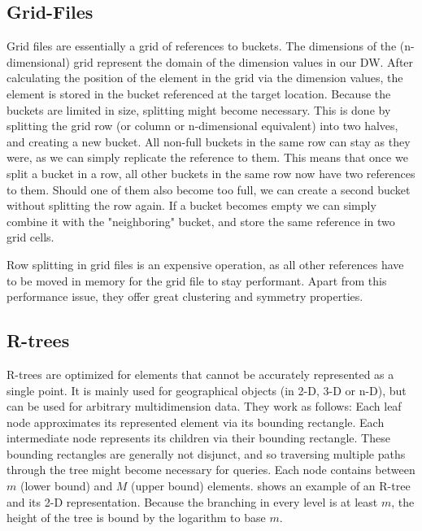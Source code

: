 \documentclass{article}
\begin{document}
\subsection{Grid-Files}
Grid files are essentially a grid of references to buckets.
The dimensions of the (n-dimensional) grid represent the domain of the dimension values in our DW.
After calculating the position of the element in the grid via the dimension values, the element is stored in the bucket referenced at the target location.
Because the buckets are limited in size, splitting might become necessary.
This is done by splitting the grid row (or column or n-dimensional equivalent) into two halves, and creating a new bucket.
All non-full buckets in the same row can stay as they were, as we can simply replicate the reference to them.
This means that once we split a bucket in a row, all other buckets in the same row now have two references to them.
Should one of them also become too full, we can create a second bucket without splitting the row again.
If a bucket becomes empty we can simply combine it with the "neighboring" bucket, and store the same reference in two grid cells.

Row splitting in grid files is an expensive operation, as all other references have to be moved in memory for the grid file to stay performant.
Apart from this performance issue, they offer great clustering and symmetry properties.

\subsection{R-trees}
R-trees are optimized for elements that cannot be accurately represented as a single point.
It is mainly used for geographical objects (in 2-D, 3-D or n-D), but can be used for arbitrary multidimension data.
They work as follows:
Each leaf node approximates its represented element via its bounding rectangle.
Each intermediate node represents its children via their bounding rectangle.
These bounding rectangles are generally not disjunct, and so traversing multiple paths through the tree might become necessary for queries.
Each node contains between $m$ (lower bound) and $M$ (upper bound) elements.
 shows an example of an R-tree and its 2-D representation.
Because the branching in every level is at least $m$, the height of the tree is bound by the logarithm to base $m$.
\end{document}
